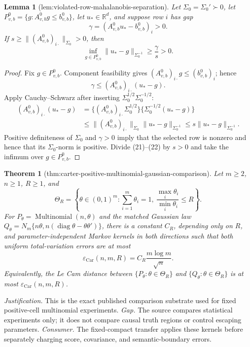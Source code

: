 \documentclass{article}
\newtheorem{theorem}{Theorem}
\newtheorem{lemma}{Lemma}
\begin{document}
\begin{lemma}[lem:violated-row-mahalanobis-separation]\label{lem:violated-row-mahalanobis-separation}
Let \(\Sigma_0=\Sigma_0'\succ0\), let \(P_{v,b}^0=\{g:A_{v,b}^0g\le b_{v,b}^0\}\), let \(u_*\in\mathbb R^d\), and suppose row \(i\) has gap
\[
 \gamma=(A_{v,b}^0u_*-b_{v,b}^0)_i>0.
\]
If \(s\ge\|(A_{v,b}^0)_{i\cdot}\|_{\Sigma_0}>0\), then
\[
 \inf_{g\in P_{v,b}^0}\|u_*-g\|_{\Sigma_0^{-1}}
 \ge \frac{\gamma}{s}>0.
\]
\end{lemma}
\begin{proof}
Fix \(g\in P_{v,b}^0\).  Component feasibility gives \((A_{v,b}^0)_{i\cdot}g\le(b_{v,b}^0)_i\); hence
\[
 \gamma
 \le (A_{v,b}^0)_{i\cdot}(u_*-g). \tag{21}
\]
Apply Cauchy--Schwarz after inserting \(\Sigma_0^{1/2}\Sigma_0^{-1/2}\):
\[
 \begin{aligned}
 (A_{v,b}^0)_{i\cdot}(u_*-g)
 &=\{(A_{v,b}^0)_{i\cdot}\Sigma_0^{1/2}\}
   \{\Sigma_0^{-1/2}(u_*-g)\}\\
 &\le \|(A_{v,b}^0)_{i\cdot}\|_{\Sigma_0}
       \|u_*-g\|_{\Sigma_0^{-1}}
 \le s\|u_*-g\|_{\Sigma_0^{-1}}.
 \end{aligned} \tag{22}
\]
Positive definiteness of \(\Sigma_0\) and \(\gamma>0\) imply that the selected row is nonzero and hence that its \(\Sigma_0\)-norm is positive.  Divide (21)--(22) by \(s>0\) and take the infimum over \(g\in P_{v,b}^0\).
\end{proof}

\begin{theorem}[thm:carter-positive-multinomial-gaussian-comparison]\label{thm:carter-positive-multinomial-gaussian-comparison}
Let \(m\ge 2\), \(n\ge 1\), \(R\ge 1\), and
\[
 \Theta_R=\left\{\theta\in(0,1)^m:\sum_{i=1}^m\theta_i=1,
 \ \frac{\max_i\theta_i}{\min_i\theta_i}\le R\right\}.
\]
For \(P_\theta=\operatorname{Multinomial}(n,\theta)\) and the matched Gaussian law
\(Q_\theta=N_m\{n\theta,n(\operatorname{diag}\theta-\theta\theta')\}\), there is a constant \(C_R\), depending only on \(R\), and parameter-independent Markov kernels in both directions such that both uniform total-variation errors are at most
\[
 \varepsilon_{\mathrm{Car}}(n,m,R)=C_R\frac{m\log m}{\sqrt n}.
\]
Equivalently, the Le Cam distance between \(\{P_\theta:\theta\in\Theta_R\}\) and \(\{Q_\theta:\theta\in\Theta_R\}\) is at most \(\varepsilon_{\mathrm{Car}}(n,m,R)\).
\end{theorem}
\par\smallskip\noindent \textit{Justification.} This is the exact published comparison substrate used for fixed positive-cell multinomial experiments. \textit{Gap.} The source compares statistical experiments only; it does not compare causal truth regions or control escaping parameters. \textit{Consumer.} The fixed-compact transfer applies these kernels before separately charging score, covariance, and semantic-boundary errors.
\end{document}
